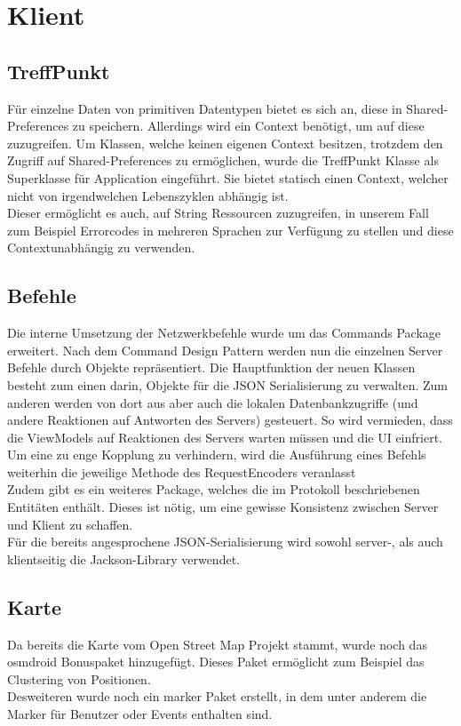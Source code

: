 \documentclass[parskip=full,11pt]{scrartcl}
\begin{document}
\pagebreak
\section{Klient}

\subsection{TreffPunkt}
Für einzelne Daten von primitiven Datentypen bietet es sich an, diese in
Shared-Preferences zu speichern. Allerdings wird ein Context benötigt, um auf
diese zuzugreifen. Um Klassen, welche keinen eigenen Context besitzen, trotzdem
den Zugriff auf Shared-Preferences zu ermöglichen, wurde die TreffPunkt Klasse
als Superklasse für Application eingeführt. Sie bietet statisch einen Context,
welcher nicht von irgendwelchen Lebenszyklen abhängig ist.\\
Dieser ermöglicht es auch, auf String Ressourcen zuzugreifen, in unserem Fall
zum Beispiel Errorcodes in mehreren Sprachen zur Verfügung zu stellen und diese
Contextunabhängig zu verwenden.

\subsection{Befehle}
Die interne Umsetzung der Netzwerkbefehle wurde um das Commands Package
erweitert. Nach dem Command Design Pattern werden nun die einzelnen Server
Befehle durch Objekte repräsentiert. Die Hauptfunktion der neuen Klassen
besteht zum einen darin, Objekte für die JSON Serialisierung zu verwalten. Zum
anderen werden von dort aus aber auch die lokalen Datenbankzugriffe (und
andere Reaktionen auf Antworten des Servers) gesteuert. So wird vermieden, dass
die ViewModels auf Reaktionen des Servers warten müssen und die UI einfriert.
Um eine zu enge Kopplung zu verhindern, wird die Ausführung eines Befehls
weiterhin die jeweilige Methode des RequestEncoders veranlasst\\
Zudem gibt es ein weiteres Package, welches die im Protokoll beschriebenen
Entitäten enthält. Dieses ist nötig, um eine gewisse Konsistenz zwischen Server
und Klient zu schaffen.\\
Für die bereits angesprochene JSON-Serialisierung wird sowohl server-, als
auch klientseitig die Jackson-Library verwendet.

\subsection{Karte}
Da bereits die Karte vom Open Street Map Projekt stammt, wurde noch das 
osmdroid Bonuspaket hinzugefügt. Dieses Paket ermöglicht zum Beispiel 
das Clustering von Positionen.\\
Desweiteren wurde noch ein marker Paket erstellt, in dem unter anderem die 
Marker für Benutzer oder Events enthalten sind.
\end{document}
